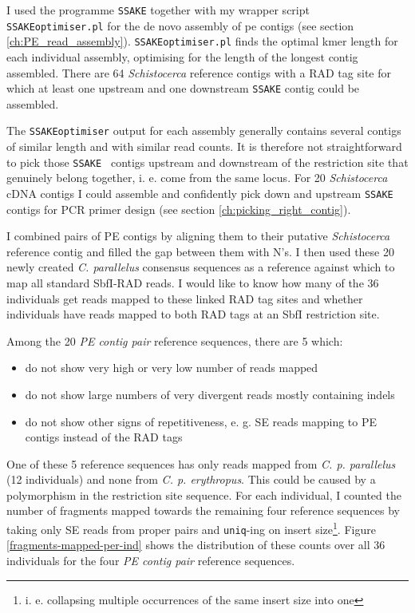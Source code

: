 \documentclass[a4paper,12pt,times,print,index, custombib]{PhDThesisPSnPDF}\usepackage[]{graphicx}\usepackage[]{color}
\begin{document}
I used the programme \texttt{SSAKE} \citep{Warren2007} together with my wrapper script \texttt{SSAKEoptimiser.pl} for the de novo assembly of \gls{pe} contigs (see section \ref{ch:PE_read_assembly}). \texttt{SSAKEoptimiser.pl} finds the optimal \gls{kmer} length for each individual assembly, optimising for the length of the longest contig assembled. There are 64 \textit{Schistocerca} reference contigs with a RAD tag site for which at least one upstream and one downstream \texttt{SSAKE} contig could be assembled.

The \texttt{SSAKEoptimiser} output for each assembly generally contains several \glspl{contig} of similar length and with similar read counts. It is therefore not straightforward to pick those \texttt{SSAKE } contigs upstream and downstream of the restriction site that genuinely belong together, i. e. come from the same locus. For 20 \textit{Schistocerca} cDNA contigs I could assemble and confidently pick down and upstream \texttt{SSAKE} contigs for PCR primer design (see section \ref{ch:picking_right_contig}). 

I combined pairs of PE contigs by aligning them to their putative \textit{Schistocerca} reference contig and filled the gap between them with N's. I then used these 20 newly created \textit{C. parallelus} consensus sequences as a reference against which to map all standard SbfI-RAD reads. I would like to know how many of the 36 individuals get reads mapped to these \glspl{linked RAD tag site} and whether individuals have reads mapped to both \glspl{RAD tag} at an SbfI restriction site.

Among the 20 \emph{PE contig pair} reference sequences, there are 5 which:

\begin{itemize}
\item do not show very high or very low number of reads mapped
\item do not show large numbers of very divergent reads mostly containing \glspl{indel}
\item do not show other signs of repetitiveness, e. g. SE reads mapping to PE contigs instead of the \glspl{RAD tag}
\end{itemize}

One of these 5 reference sequences has only reads mapped from \textit{C. p. parallelus} (12 individuals) and none from \textit{C. p. erythropus}. This could be caused by a polymorphism in the restriction site sequence. For each individual, I counted the number of \glspl{fragment} mapped towards the remaining four reference sequences by taking only SE reads from \glspl{proper pair} and \texttt{uniq}-ing on insert size\footnote{i. e. collapsing multiple occurrences of the same insert size into one}. Figure \ref{fragments-mapped-per-ind} shows the distribution of these counts over all 36 individuals for the four \emph{PE contig pair} reference sequences.
\end{document}
